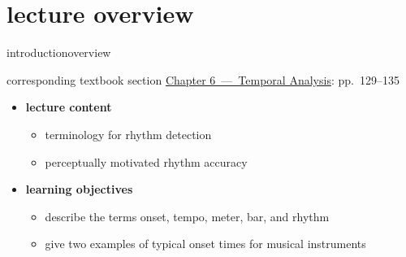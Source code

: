 




\subtitle{Module 6.0: Introduction to Tempo \& Rhythm Terminology}


	

    \section[overview]{lecture overview}
        \begin{frame}{introduction}{overview}
            \begin{block}{corresponding textbook section}
                    \href{http://ieeexplore.ieee.org/xpl/articleDetails.jsp?arnumber=6331123}{Chapter 6~---~Temporal Analysis}: pp.~129--135
            \end{block}

            \begin{itemize}
                \item   \textbf{lecture content}
                    \begin{itemize}
                        \item   terminology for rhythm detection
                        \item   perceptually motivated rhythm accuracy
                    \end{itemize}
                \bigskip
                \item<2->   \textbf{learning objectives}
                    \begin{itemize}
                        \item   describe the terms onset, tempo, meter, bar, and rhythm
                        \item   give two examples of typical onset times for musical instruments
                    \end{itemize}
            \end{itemize}
        \end{frame}

